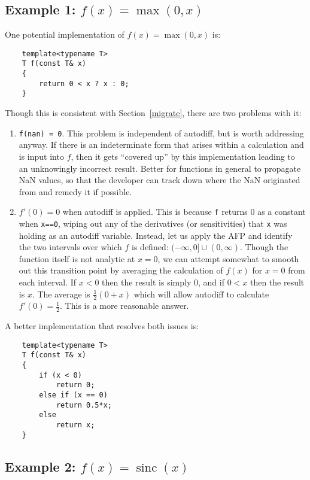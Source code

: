 \documentclass{article}
\DeclareMathOperator{\sinc}{sinc}
\begin{document}
\subsection{Example 1: $f(x)=\max(0,x)$}

One potential implementation of $f(x)=\max(0,x)$ is:

\begin{verbatim}
    template<typename T>
    T f(const T& x)
    {
        return 0 < x ? x : 0;
    }
\end{verbatim}
Though this is consistent with Section~\ref{migrate}, there are two problems with it:

\begin{enumerate}
\item {\tt f(nan) = 0}. This problem is independent of autodiff, but is worth addressing anyway. If there is
    an indeterminate form that arises within a calculation and is input into $f$, then it gets ``covered up'' by
    this implementation leading to an unknowingly incorrect result. Better for functions in general to propagate
    NaN values, so that the developer can track down where the NaN originated from and remedy it if possible.
\item $f'(0) = 0$ when autodiff is applied. This is because {\tt f} returns 0 as a constant when {\tt x==0}, wiping
    out any of the derivatives (or sensitivities) that {\tt x} was holding as an autodiff variable. Instead, let us
    apply the AFP and identify the two intervals over which $f$ is defined: $(-\infty,0]\cup(0,\infty)$.
    Though the function itself is not analytic at $x=0$, we can attempt somewhat to smooth out this transition
    point by averaging the calculation of $f(x)$ for $x=0$ from each interval. If $x<0$ then the result is simply
    0, and if $0<x$ then the result is $x$. The average is $\frac{1}{2}(0 + x)$ which will allow autodiff to
    calculate $f'(0)=\frac{1}{2}$. This is a more reasonable answer.
\end{enumerate}
A better implementation that resolves both issues is:
\begin{verbatim}
    template<typename T>
    T f(const T& x)
    {
        if (x < 0)
            return 0;
        else if (x == 0)
            return 0.5*x;
        else
            return x;
    }
\end{verbatim}

\subsection{Example 2: $f(x)=\sinc(x)$}
\end{document}
